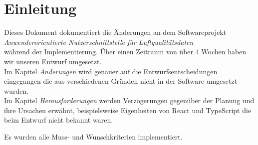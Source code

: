 \section{Einleitung}
Dieses Dokument dokumentiert die Änderungen an dem Softwareprojekt \\
\emph{Anwenderorientierte Nutzerschnittstelle für Luftqualitätsdaten}\\
während der Implementierung. Über einen Zeitraum von über 4 Wochen haben wir unseren Entwurf umgesetzt.\\

Im Kapitel \emph{Änderungen} wird genauer auf die Entwurfsentscheidungen eingegangen die 
aus verschiedenen Gründen nicht in der Software umgesetzt wurden.\\
Im Kapitel \emph{Herausforderungen} werden Verzögerungen gegenüber der Planung 
und ihre Ursachen erwähnt, beispielsweise Eigenheiten von React und TypeScript die beim
Entwurf nicht bekannt waren.

\bigskip
Es wurden alle Muss- und Wunschkriterien implementiert.
